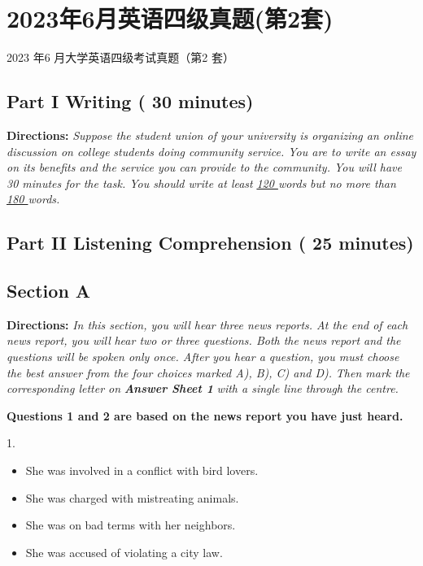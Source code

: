 \documentclass[UTF8,11pt]{ctexart}
\begin{document}
\section*{2023年6月英语四级真题(第2套)}
2023 年6 月大学英语四级考试真题（第2 套）


\subsection*{\textbf{Part I Writing} \textbf{( 30 minutes)}}


\textbf{Directions:}\textit{ Suppose the student union of your university is organizing an online discussion on college} \textit{students doing community service. You are to write an essay on its benefits and the service you can} \textit{provide to the community. You will have 30 minutes for the task. You should write at least }\textit{\uline{120 }}\textit{words} \textit{but no more than }\textit{\uline{180 }}\textit{words.}


\subsection*{\textbf{Part II} \textbf{Listening Comprehension} \textbf{( 25 minutes)}}


\subsection*{\textbf{Section A}}


\textbf{Directions:} \textit{In this section, you will hear three news reports. At the end of each news report, you will} \textit{hear two or three questions. Both the news report and the questions will be spoken only once. After} \textit{you hear a question, you must choose the best answer from the four choices marked A), B), C) and D).} \textit{Then mark the corresponding letter on }\textbf{\textit{Answer Sheet 1}}\textit{ with a single line through the centre.}


\textbf{Questions 1 and 2 are based on the news report you have just heard.}


1.


\begin{itemize}[leftmargin=2em,itemsep=.2em,topsep=.4em]\item[A.] She was involved in a conflict with bird lovers.
\item[B.] She was charged with mistreating animals.
\item[C.] She was on bad terms with her neighbors.
\item[D.] She was accused of violating a city law.
\end{itemize}
\end{document}
